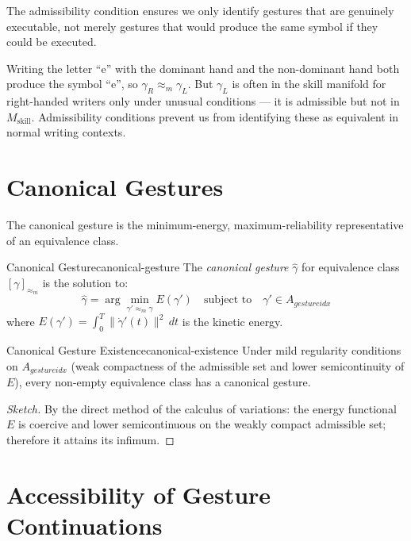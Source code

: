 The admissibility condition ensures we only identify gestures that are
genuinely executable, not merely gestures that would produce the same
symbol if they could be executed.

\begin{example}
  Writing the letter ``e'' with the dominant hand and the non-dominant
  hand both produce the symbol ``e'', so $\gamma_R \approx_m \gamma_L$.
  But $\gamma_L$ is often in the skill manifold for right-handed writers
  only under unusual conditions — it is admissible but not in $M_\text{skill}$.
  Admissibility conditions prevent us from identifying these as equivalent
  in normal writing contexts.
\end{example}

\section{Canonical Gestures}

The canonical gesture is the minimum-energy, maximum-reliability
representative of an equivalence class.

\begin{definition}{Canonical Gesture}{canonical-gesture}
  The \emph{canonical gesture} $\hat{\gamma}$ for equivalence class
  $[\gamma]_{\approx_m}$ is the solution to:
  \[
    \hat{\gamma} = \arg\min_{\gamma' \approx_m \gamma} E(\gamma')
    \quad \text{subject to} \quad \gamma' \in A_{gestureidx}
  \]
  where $E(\gamma') = \int_0^T \|\dot{\gamma}'(t)\|^2\,dt$ is the
  kinetic energy.
\end{definition}

\begin{theorem}{Canonical Gesture Existence}{canonical-existence}
  Under mild regularity conditions on $A_{gestureidx}$
  (weak compactness of the admissible set and lower semicontinuity of $E$),
  every non-empty equivalence class has a canonical gesture.
\end{theorem}

\begin{proof}[Sketch]
  By the direct method of the calculus of variations: the energy
  functional $E$ is coercive and lower semicontinuous on the weakly
  compact admissible set; therefore it attains its infimum.
\end{proof}

\section{Accessibility of Gesture Continuations}

